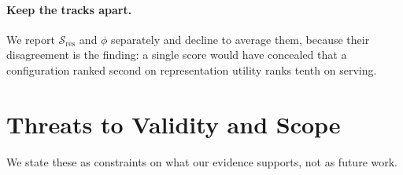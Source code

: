 \documentclass[sigplan,10pt,anonymous,review,nonacm]{acmart}
\newcommand{\Sres}{\mathcal{S}_{\text{res}}}
\begin{document}
\paragraph{Keep the tracks apart.}
We report $\Sres$ and $\phi$ separately and decline to average them, because
their disagreement is the finding: a single score would have concealed that a
configuration ranked second on representation utility ranks tenth on serving.

\section{Threats to Validity and Scope}
\label{sec:threats}

We state these as constraints on what our evidence supports, not as future
work.
\end{document}
